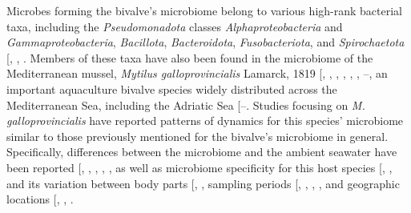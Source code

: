 \documentclass[
  12 pt,
]{article}
\begin{document}
Microbes forming the bivalve's microbiome belong to various high-rank bacterial taxa, including the \emph{Pseudomonadota} classes \emph{Alphaproteobacteria} and \emph{Gammaproteobacteria}, \emph{Bacillota}, \emph{Bacteroidota}, \emph{Fusobacteriota}, and \emph{Spirochaetota} {[}, , \citeproc{ref-Lasa2019}{25}{]}. Members of these taxa have also been found in the microbiome of the Mediterranean mussel, \emph{Mytilus galloprovincialis} Lamarck, 1819 {[}, , , , , , --\citeproc{ref-Zardinoni2024}{31}{]}, an important aquaculture bivalve species widely distributed across the Mediterranean Sea, including the Adriatic Sea {[}--\citeproc{ref-Wenne2022}{36}{]}. Studies focusing on \emph{M. galloprovincialis} have reported patterns of dynamics for this species' microbiome similar to those previously mentioned for the bivalve's microbiome in general. Specifically, differences between the microbiome and the ambient seawater have been reported {[}, , , , \citeproc{ref-Zardinoni2024}{31}{]}, as well as microbiome specificity for this host species {[}, , \citeproc{ref-Munoz-Martinez2026}{18}{]} and its variation between body parts {[}, \citeproc{ref-Vezzulli2018}{15}{]}, sampling periods {[}, , , \citeproc{ref-Wathsala2021}{30}{]}, and geographic locations {[}, , \citeproc{ref-Palladino2023}{28}{]}.
\end{document}
